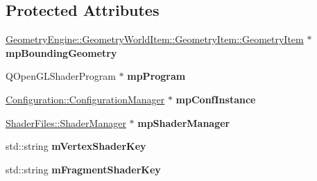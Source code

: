\subsection*{Protected Attributes}
\begin{DoxyCompactItemize}
\item 
\mbox{\label{class_geometry_engine_1_1_geometry_post_process_1_1_post_process_adf90d94f8c00b7fd9eb6286d57699559}} 
\mbox{\hyperlink{class_geometry_engine_1_1_geometry_world_item_1_1_geometry_item_1_1_geometry_item}{Geometry\+Engine\+::\+Geometry\+World\+Item\+::\+Geometry\+Item\+::\+Geometry\+Item}} $\ast$ {\bfseries mp\+Bounding\+Geometry}
\item 
\mbox{\label{class_geometry_engine_1_1_geometry_post_process_1_1_post_process_aba344bd1d71b013ec7fed0319a4a5904}} 
Q\+Open\+G\+L\+Shader\+Program $\ast$ {\bfseries mp\+Program}
\item 
\mbox{\label{class_geometry_engine_1_1_geometry_post_process_1_1_post_process_a90d5206b07e59c7b34f7e43bb8832636}} 
\mbox{\hyperlink{class_configuration_1_1_configuration_manager}{Configuration\+::\+Configuration\+Manager}} $\ast$ {\bfseries mp\+Conf\+Instance}
\item 
\mbox{\label{class_geometry_engine_1_1_geometry_post_process_1_1_post_process_a1cc028176cf87c2b82694fe56896937e}} 
\mbox{\hyperlink{class_shader_files_1_1_shader_manager}{Shader\+Files\+::\+Shader\+Manager}} $\ast$ {\bfseries mp\+Shader\+Manager}
\item 
\mbox{\label{class_geometry_engine_1_1_geometry_post_process_1_1_post_process_ad435249babab48a1df24532c314f8f43}} 
std\+::string {\bfseries m\+Vertex\+Shader\+Key}
\item 
\mbox{\label{class_geometry_engine_1_1_geometry_post_process_1_1_post_process_a9fa0ab7cc584c09e5421bf3a79a26789}} 
std\+::string {\bfseries m\+Fragment\+Shader\+Key}
\end{DoxyCompactItemize}


